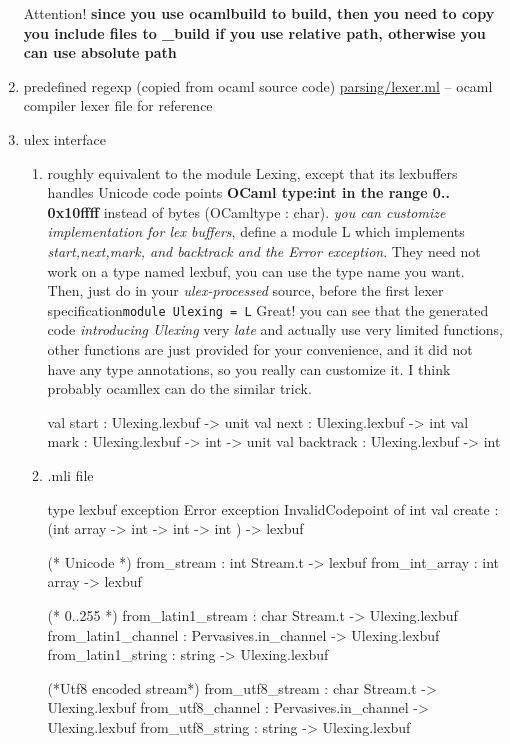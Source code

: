 \begin{enumerate}
    Attention! \textbf{ since you use ocamlbuild to build, then you need to copy you include
    files to \_build if you use relative path, otherwise you can use absolute path}
\item predefined regexp (copied from ocaml source code)
  \href{file:/Users/bob/SourceCode/ML/godi/build/distfiles/ocaml-3.12.1/parsing/lexer.ml}{parsing/lexer.ml} -- ocaml compiler lexer file for reference 
\item ulex interface
  \begin{enumerate}
  \item roughly equivalent to the module Lexing, except that its lexbuffers handles Unicode
    code points\textbf{ OCaml type:int in the range 0.. 0x10ffff}
    instead of bytes (OCamltype : char). \emph{you can customize implementation for lex buffers}, define a module L which implements \emph{start,next,mark, and backtrack and the Error exception}. They need not work on a type named lexbuf, you can use the type name you want. Then, just do in your \emph{ulex-processed} source, before the first lexer specification\verb|module Ulexing = L|
    Great! you can see that the generated code \emph{introducing Ulexing } very \emph{late}
    and actually use very limited functions, other functions are just provided for your
    convenience, and it did not have any type annotations, so you really can customize it. I think probably ocamllex can do the similar trick.
    

\begin{bluetext}
val start : Ulexing.lexbuf -> unit
val next : Ulexing.lexbuf -> int
val mark : Ulexing.lexbuf -> int -> unit
val backtrack : Ulexing.lexbuf -> int
\end{bluetext}


  \item .mli file 


\begin{bluecode}
type lexbuf
exception Error
exception InvalidCodepoint of int
val create : (int array -> int -> int -> int ) -> lexbuf

(* Unicode *)
from_stream : int Stream.t -> lexbuf
from_int_array : int array -> lexbuf

(* 0..255 *)
from_latin1_stream : char Stream.t -> Ulexing.lexbuf
from_latin1_channel : Pervasives.in_channel -> Ulexing.lexbuf
from_latin1_string : string -> Ulexing.lexbuf


(*Utf8 encoded stream*)
from_utf8_stream : char Stream.t -> Ulexing.lexbuf
from_utf8_channel : Pervasives.in_channel -> Ulexing.lexbuf
from_utf8_string : string -> Ulexing.lexbuf



\end{bluecode}
\end{enumerate}
\end{enumerate}
